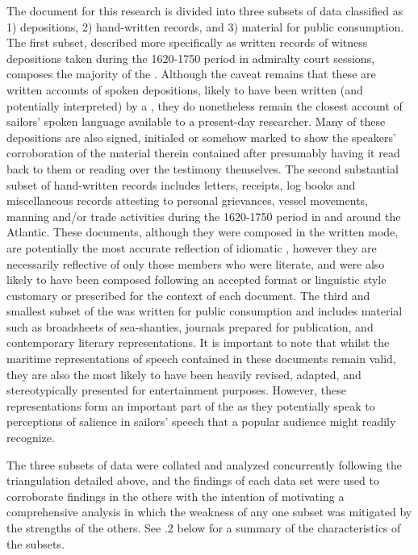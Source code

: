 The document  for this research is divided into three subsets of data classified as 1) depositions, 2) hand-written records, and 3) material for public consumption. The first subset, described more specifically as written records of witness depositions taken during the 1620-1750 period in admiralty court sessions, composes the majority of the . Although the caveat remains that these are written accounts of spoken depositions, likely to have been written (and potentially interpreted) by a , they do nonetheless remain the closest account of sailors’ spoken language available to a present-day researcher. Many of these depositions are also signed, initialed or somehow marked to show the speakers’ corroboration of the material therein contained after presumably having it read back to them or reading over the testimony themselves. The second substantial subset of hand-written records includes letters, receipts, log books and miscellaneous records attesting to personal grievances, vessel movements, manning and/or trade activities during the 1620-1750 period in and around the Atlantic. These documents, although they were composed in the written mode, are potentially the most accurate reflection of idiomatic , however they are necessarily reflective of only those  members who were literate, and were also likely to have been composed following an accepted format or linguistic style customary or prescribed for the context of each document. The third and smallest subset of the  was written for public consumption and includes material such as broadsheets of sea-shanties, journals prepared for publication, and contemporary literary representations. It is important to note that whilst the maritime representations of speech contained in these documents remain valid, they are also the most likely to have been heavily revised, adapted, and stereotypically presented for entertainment purposes. However, these representations form an important part of the  as they potentially speak to perceptions of salience in sailors’ speech that a popular audience might readily recognize. 



The three subsets of data were collated and analyzed concurrently following the triangulation  detailed above, and the findings of each data set were used to corroborate findings in the others with the intention of motivating a comprehensive analysis in which the weakness of any one subset was mitigated by the strengths of the others. See .2 below for a summary of the characteristics of the  subsets. 





